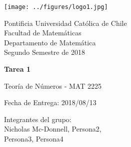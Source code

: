 


\begin{minipage}{2.5cm}
	\texttt{[image: ../figures/logo1.jpg]}
\end{minipage}
\begin{minipage}{13cm}
	\begin{flushleft}
		\raggedright
		{
			\noindent
			{\sc Pontificia Universidad Católica de Chile\\
				Facultad de Matemáticas\\
				Departamento de Matemática} \smallskip \\
			Segundo Semestre de 2018\\
		}
	\end{flushleft}
\end{minipage}

\vspace{2ex}
{\Large \centerline{\bf Tarea 1}}
{\large \centerline{Teoría de Números - MAT 2225}}
\centerline{Fecha de Entrega: 2018/08/13}

\begin{flushright}
    Integrantes del grupo:\\
    Nicholas Mc-Donnell, Persona2,\\
    Persona3, Persona4
\end{flushright}

